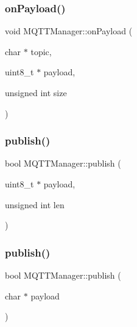 \subsubsection{\texorpdfstring{on\+Payload()}{onPayload()}}
{\footnotesize\ttfamily void M\+Q\+T\+T\+Manager\+::on\+Payload (\begin{DoxyParamCaption}\item[{char $\ast$}]{topic,  }\item[{uint8\+\_\+t $\ast$}]{payload,  }\item[{unsigned int}]{size }\end{DoxyParamCaption})\hspace{0.3cm}{\ttfamily [private]}}

\mbox{\label{class_m_q_t_t_manager_a1559f6ac139c883032ecf9283304b3f4}} 
\subsubsection{\texorpdfstring{publish()}{publish()}\hspace{0.1cm}{\footnotesize\ttfamily [1/3]}}
{\footnotesize\ttfamily bool M\+Q\+T\+T\+Manager\+::publish (\begin{DoxyParamCaption}\item[{uint8\+\_\+t $\ast$}]{payload,  }\item[{unsigned int}]{len }\end{DoxyParamCaption})\hspace{0.3cm}{\ttfamily [private]}}

\mbox{\label{class_m_q_t_t_manager_aba95650540cd217055d1e0b993988561}} 
\subsubsection{\texorpdfstring{publish()}{publish()}\hspace{0.1cm}{\footnotesize\ttfamily [2/3]}}
{\footnotesize\ttfamily bool M\+Q\+T\+T\+Manager\+::publish (\begin{DoxyParamCaption}\item[{char $\ast$}]{payload }\end{DoxyParamCaption})\hspace{0.3cm}{\ttfamily [private]}}

